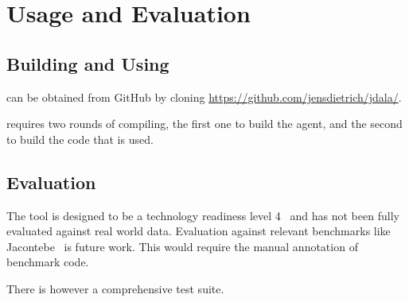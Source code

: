 \section{Usage and Evaluation}
\label{sec:useandevaluate}	


\subsection{Building and Using \jdala}

\jdala can be obtained from GitHub by cloning \url{https://github.com/jensdietrich/jdala/}.


\jdala requires two rounds of compiling, the first one to build the agent, and the second to build the code that is used. 


\subsection{Evaluation}


The tool is designed to be a technology readiness level 4~\cite{mankins1995technology} and has not been fully evaluated against real world data. Evaluation against relevant  benchmarks like Jacontebe~\cite{lin2015jacontebe} is future work. This would require the manual annotation of benchmark code. 

There is however a comprehensive test suite.  


